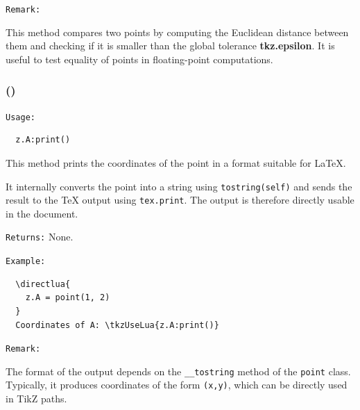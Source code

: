   \medskip
  \texttt{Remark: }

  This method compares two points by computing the Euclidean distance between them
  and checking if it is smaller than the global tolerance \textbf{tkz.epsilon}.
  It is useful to test equality of points in floating-point computations.



  \subsubsection{()}
  \label{ssub:print}

  \texttt{Usage:}
  \begin{verbatim}
  z.A:print()
  \end{verbatim}

  \medskip

  This method prints the coordinates of the point in a format suitable for \LaTeX{}.

  It internally converts the point into a string using \texttt{tostring(self)} and sends the result to the \TeX{} output using \texttt{tex.print}. The output is therefore directly usable in the document.

  \medskip

  \texttt{Returns:} None.

  \medskip

  \texttt{Example:}
  \begin{verbatim}
  \directlua{
    z.A = point(1, 2)
  }
  Coordinates of A: \tkzUseLua{z.A:print()}
  \end{verbatim}

  \medskip

  \texttt{Remark:}

  The format of the output depends on the \texttt{\_\_tostring} method of the \texttt{point} class. Typically, it produces coordinates of the form \texttt{(x,y)}, which can be directly used in TikZ paths.
\endinput